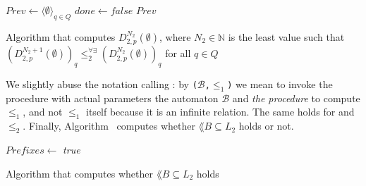 \begin{algorithm}[h]
\label{alg:periods}

\SetAlgoLined
\LinesNumbered
{}
$Prev \leftarrow \langle \emptyset \rangle_{q \in Q}$ \;
$done \leftarrow false$ \;
\Return $Prev$
\caption{Algorithm that computes $D_{2,p}^{N_2}(\emptyset)$, where
$N_2 \in \mathbb{N}$ is the least value such that $(D_{2,p}^{N_2+1}(\emptyset))_q \leq_2^{\forall \exists} (D_{2,p}^{N_2}(\emptyset))_q$
for all $q \in Q$}
\end{algorithm}

We slightly abuse the notation calling :
by \texttt{($\mathcal{B}$,$\leq_1$)} we mean to invoke the procedure
 with actual parameters the automaton $\mathcal{B}$ and
\emph{the procedure} to compute $\leq_1$, and not $\leq_1$ itself because
it is an infinite relation.
The same holds for  and $\leq_2$.
Finally, Algorithm~ computes whether
$\lang{B} \subseteq L_2$ holds or not.
\begin{algorithm}[h]
\label{alg:omega-lang-inc}
\SetKwProg{}{}{}{} 

\SetAlgoLined
\LinesNumbered
{}
$Prefixes \leftarrow $ \;
\Return \emph{true}
\caption{Algorithm that computes whether $\lang{B} \subseteq L_2$ holds}
\end{algorithm}


